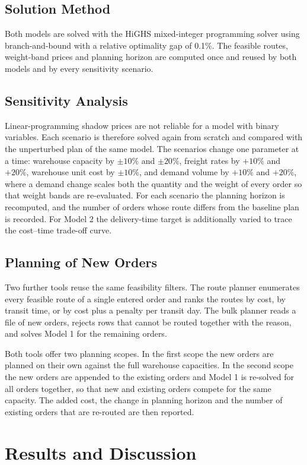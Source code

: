 \documentclass[conference]{IEEEtran}
\begin{document}
\subsection{Solution Method}
Both models are solved with the HiGHS mixed-integer programming solver \cite{highs} using branch-and-bound with a relative optimality gap of 0.1\%. The feasible routes, weight-band prices and planning horizon are computed once and reused by both models and by every sensitivity scenario.

\subsection{Sensitivity Analysis}
Linear-programming shadow prices are not reliable for a model with binary variables. Each scenario is therefore solved again from scratch and compared with the unperturbed plan of the same model. The scenarios change one parameter at a time: warehouse capacity by $\pm 10\%$ and $\pm 20\%$, freight rates by $+10\%$ and $+20\%$, warehouse unit cost by $\pm 10\%$, and demand volume by $+10\%$ and $+20\%$, where a demand change scales both the quantity and the weight of every order so that weight bands are re-evaluated. For each scenario the planning horizon is recomputed, and the number of orders whose route differs from the baseline plan is recorded. For Model 2 the delivery-time target is additionally varied to trace the cost--time trade-off curve.

\subsection{Planning of New Orders}
Two further tools reuse the same feasibility filters. The route planner enumerates every feasible route of a single entered order and ranks the routes by cost, by transit time, or by cost plus a penalty per transit day. The bulk planner reads a file of new orders, rejects rows that cannot be routed together with the reason, and solves Model 1 for the remaining orders.

Both tools offer two planning scopes. In the first scope the new orders are planned on their own against the full warehouse capacities. In the second scope the new orders are appended to the existing orders and Model 1 is re-solved for all orders together, so that new and existing orders compete for the same capacity. The added cost, the change in planning horizon and the number of existing orders that are re-routed are then reported.

\section{Results and Discussion}
\end{document}
